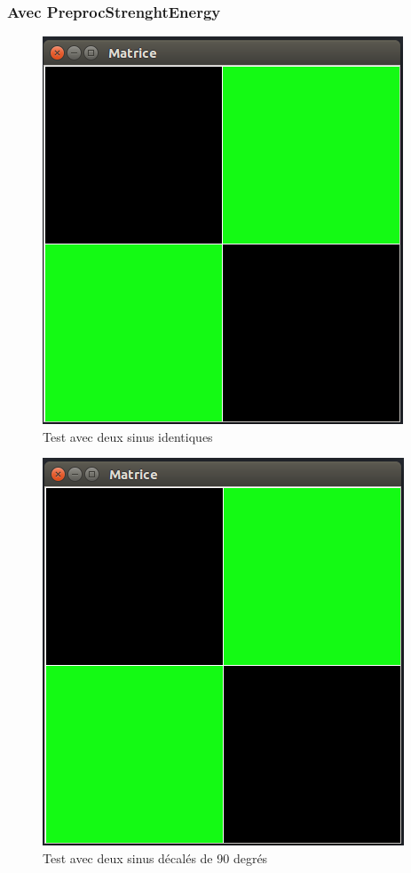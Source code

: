 \subsubsection{Avec PreprocStrenghtEnergy}
\begin{figure}[H]
    \centering
    \includegraphics[scale=0.3]{assets/Captures-sinus/PreprocStrengthnormal-normal.png}
    \caption{Test avec deux sinus identiques}
    \label{}
\end{figure}
\begin{figure}[H]
    \centering
    \includegraphics[scale=0.3]{assets/Captures-sinus/PreprocStrengthnormal-90.png}
    \caption{Test avec deux sinus décalés de 90 degrés}
    \label{}
\end{figure}
